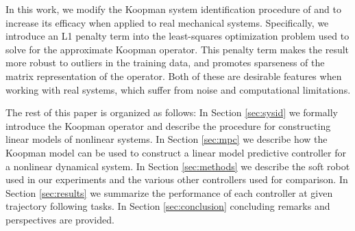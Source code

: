 In this work, we modify the Koopman system identification procedure of \citet{mauroy2016linear} and \citet{korda2018linear} to increase its efficacy when applied to real mechanical systems.
Specifically, we introduce an L1 penalty term into the least-squares optimization problem used to solve for the approximate Koopman operator.
This penalty term makes the result more robust to outliers in the training data, and promotes sparseness of the matrix representation of the operator.
Both of these are desirable features when working with real systems, which suffer from noise and computational limitations.



The rest of this paper is organized as follows:
In Section \ref{sec:sysid} we formally introduce the Koopman operator and describe the procedure for constructing linear models of nonlinear systems. 
In Section \ref{sec:mpc} we describe how the Koopman model can be used to construct a linear model predictive controller for a nonlinear dynamical system.
In Section \ref{sec:methods} we describe the soft robot used in our experiments and the various other controllers used for comparison.
In Section \ref{sec:results} we summarize the performance of each controller at given trajectory following tasks.
In Section \ref{sec:conclusion} concluding remarks and perspectives are provided.



